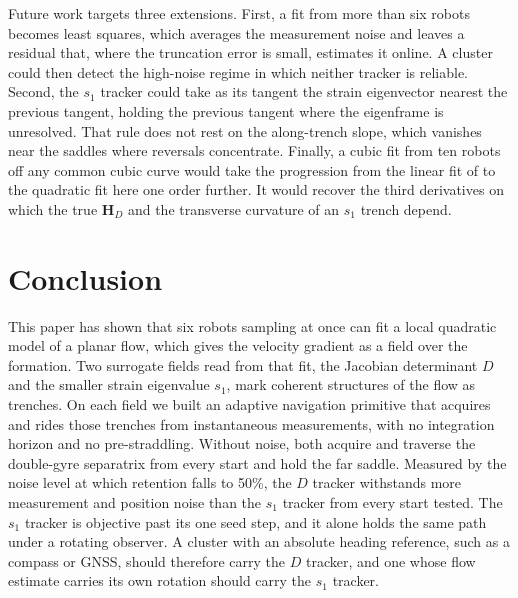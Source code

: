 \documentclass[lettersize,journal]{IEEEtran}
\begin{document}
Future work targets three extensions. First, a fit from more than six
robots becomes least squares, which averages the measurement noise and
leaves a residual that, where the truncation error is small, estimates
it online. A cluster could then detect the
high-noise regime in which neither tracker is reliable. Second, the
$s_1$ tracker could take as its tangent the strain eigenvector nearest the
previous tangent, holding the previous tangent where the eigenframe is
unresolved. That rule does not rest on the along-trench slope, which
vanishes near the saddles where reversals concentrate. Finally, a cubic fit
from ten robots off any common cubic curve would take the progression from
the linear fit of \cite{10} to the quadratic fit here one order further. It
would recover the third derivatives on which the true $\mathbf{H}_D$ and
the transverse curvature of an $s_1$ trench depend.

\section{Conclusion}

This paper has shown that six robots sampling at once can fit a local
quadratic model of a planar flow, which gives the velocity gradient as a
field over the formation. Two surrogate fields read from that fit, the
Jacobian determinant $D$ and the smaller strain eigenvalue $s_1$, mark
coherent structures of the flow as trenches. On each field we built an
adaptive navigation primitive that acquires and rides those trenches from
instantaneous measurements, with no integration horizon and no
pre-straddling. Without noise, both acquire and traverse the
double-gyre separatrix from every start and hold the far saddle. Measured
by the noise level at which retention falls to 50\%, the $D$ tracker
withstands more measurement and position noise than the $s_1$ tracker from
every start tested. The $s_1$ tracker is objective past its
one seed step, and it alone holds the same path under a rotating observer.
A cluster with an absolute heading reference, such as a compass or GNSS,
should therefore carry the $D$ tracker, and one whose flow estimate
carries its own rotation should carry the $s_1$ tracker.
\end{document}
